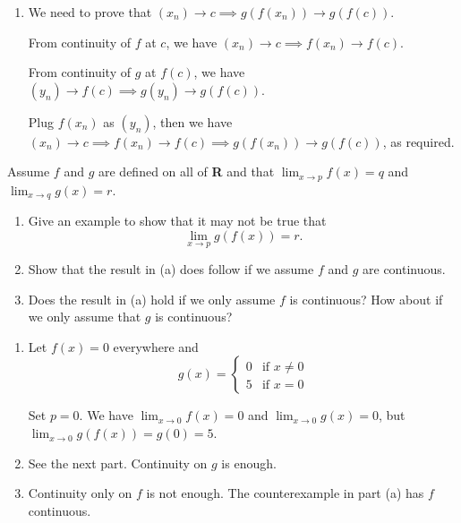 \documentclass{oxmathproblems}
\begin{document}
\begin{questions}
\begin{solution}
\begin{enumerate}[label=(\alph*)]
    Set $\epsilon_{f} = \delta_{g}$. Plug $f(x)$ as $y$, we have $|x-c| < \delta_{f} \implies |f(x)-f(c)| < \delta_{g} \implies |g(f(x))-g(f(c))| < \epsilon$, as required.

    Just don't get confused by the interchange between $y$ and $f(x)$. $y$ is just a placeholder name that stands for any input of $g$, of which the values of $f(x)$ is a part of.
 
    \item We need to prove that $(x_{n}) \to c \implies g(f(x_{n})) \to g(f(c))$.
    
    From continuity of $f$ at $c$, we have $(x_{n}) \to c \implies f(x_{n}) \to f(c)$.

    From continuity of $g$ at $f(c)$, we have $(y_{n}) \to f(c) \implies g(y_{n}) \to g(f(c))$.

    Plug $f(x_{n})$ as $(y_{n})$, then we have $(x_{n}) \to c \implies f(x_{n}) \to f(c) \implies g(f(x_{n})) \to g(f(c))$, as required.
  \end{enumerate}
\end{solution}

\miquestion Assume $f$ and $g$ are defined on all of \textbf{R} and that $\lim_{x \to p}f(x)=q$ and $\lim_{x \to q}g(x)=r$.
\begin{enumerate}[label=(\alph*)]
  \item Give an example to show that it may not be true that
  \[\lim_{x \to p}g(f(x)) = r.\]
  \item Show that the result in (a) does follow if we assume $f$ and $g$ are continuous.
  \item Does the result in (a) hold if we only assume $f$ is continuous? How about if we only assume that $g$ is continuous?
\end{enumerate}

\begin{solution}
  \begin{enumerate}[label=(\alph*)]
      \item Let $f(x) = 0$ everywhere and
      \[g(x) = 
        \begin{cases}
        0 & \text{if } x \ne 0 \\
        5 & \text{if } x = 0
        \end{cases}
      \]
      
      Set $p=0$. We have $\lim_{x \to 0}f(x) = 0$ and $\lim_{x \to 0}g(x) = 0$, but $\lim_{x \to 0}g(f(x))=g(0)=5$.
    \item See the next part. Continuity on $g$ is enough.
    \item Continuity only on $f$ is not enough. The counterexample in part (a) has $f$ continuous.
    

\end{enumerate}
\end{solution}
\end{questions}
\end{document}
